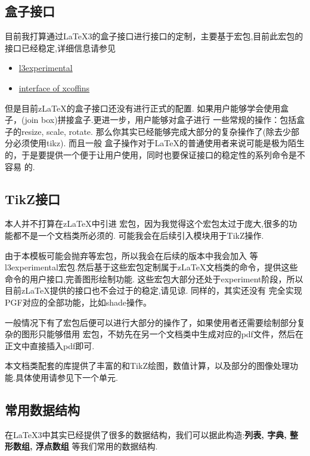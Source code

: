 \subsection{盒子接口}
目前我打算通过\LaTeX3的盒子接口进行接口的定制，主要基于宏包,目前此宏包的接口已经稳定,详细信息请参见
\begin{itemize}
    \item \href{https://ctan.org/pkg/l3experimental}{l3experimental}
    \item \href{https://tex.stackexchange.com/a/397835/294585}{interface of xcoffins}
\end{itemize}

但是目前z\LaTeX{}的盒子接口还没有进行正式的配置. 如果用户能够学会使用盒子，(join box)拼接盒子.更进一步，用户能够对盒子进行
一些常规的操作：包括盒子的resize, scale, rotate. 那么你其实已经能够完成大部分的复杂操作了(除去少部分必须使用tikz). 而且一般
盒子操作对于\LaTeX{}的普通使用者来说可能是极为陌生的，于是要提供一个便于让用户使用，同时也要保证接口的稳定性的系列命令是不容易
的.

\subsection{TikZ接口}
本人并不打算在z\LaTeX{}中引进  宏包，因为我觉得这个宏包太过于庞大,很多的功能都不是一个文档类所必须的.
可能我会在后续引入模块用于TikZ操作. 

由于本模板可能会抛弃等宏包，所以我会在后续的版本中我会加入
等l3experimental宏包.然后基于这些宏包定制属于z\LaTeX{}文档类的命令，提供这些命令的用户接口,完善图形绘制功能.
这些宏包大部分还处于experiment阶段，所以目前z\LaTeX{}提供的接口也不会过于的稳定,请见谅. 同样的，其实还没有
完全实现PGF对应的全部功能，比如shade操作。

一般情况下有了宏包后便可以进行大部分的操作了，如果使用者还需要绘制部分复杂的图形只能够借用
宏包，不妨先在另一个文档类中生成对应的pdf文件，然后在正文中直接插入pdf即可.

\begin{leftbar}
本文档类配套的库提供了丰富的和TikZ绘图，数值计算，以及部分的图像处理功能.具体使用请参见下一个单元.
\end{leftbar}

\subsection{常用数据结构}
在\LaTeX{}3中其实已经提供了很多的数据结构，我们可以据此构造:\textbf{列表, 字典, 整形数组, 浮点数组}
等我们常用的数据结构.

